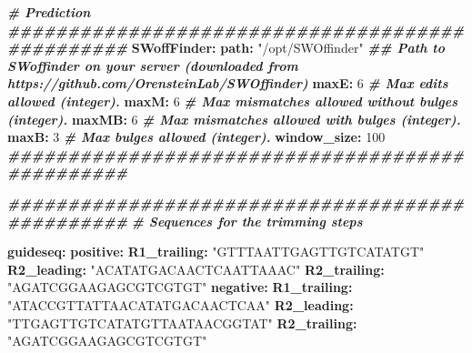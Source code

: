 \documentclass[
]{article}
\newenvironment{Shaded}{\begin{snugshade}}{\end{snugshade}}
\newcommand{\AttributeTok}[1]{\textcolor[rgb]{0.74,0.68,0.62}{#1}}
\newcommand{\CommentTok}[1]{\textcolor[rgb]{0.00,0.40,1.00}{\textbf{\textit{#1}}}}
\newcommand{\DecValTok}[1]{\textcolor[rgb]{0.27,0.67,0.26}{#1}}
\newcommand{\FunctionTok}[1]{\textcolor[rgb]{1.00,0.58,0.35}{\textbf{#1}}}
\newcommand{\KeywordTok}[1]{\textcolor[rgb]{0.26,0.66,0.93}{\textbf{#1}}}
\newcommand{\StringTok}[1]{\textcolor[rgb]{0.02,0.61,0.04}{#1}}
\begin{document}
\begin{Shaded}
\begin{Highlighting}[]
\CommentTok{\# Prediction}
\CommentTok{\#\#\#\#\#\#\#\#\#\#\#\#\#\#\#\#\#\#\#\#\#\#\#\#\#\#\#\#\#\#\#\#\#\#\#\#\#\#\#\#\#\#\#\#\#\#\#\#}
\FunctionTok{SWoffFinder}\KeywordTok{:}
\AttributeTok{  }\FunctionTok{path}\KeywordTok{:}\AttributeTok{ }\StringTok{"/opt/SWOffinder"}\CommentTok{ \#\# Path to SWoffinder on your server (downloaded from https://github.com/OrensteinLab/SWOffinder)}
\AttributeTok{  }\FunctionTok{maxE}\KeywordTok{:}\AttributeTok{ }\DecValTok{6}\CommentTok{                 \# Max edits allowed (integer).}
\AttributeTok{  }\FunctionTok{maxM}\KeywordTok{:}\AttributeTok{ }\DecValTok{6}\CommentTok{                 \# Max mismatches allowed without bulges (integer).}
\AttributeTok{  }\FunctionTok{maxMB}\KeywordTok{:}\AttributeTok{ }\DecValTok{6}\CommentTok{                \# Max mismatches allowed with bulges (integer).}
\AttributeTok{  }\FunctionTok{maxB}\KeywordTok{:}\AttributeTok{ }\DecValTok{3}\CommentTok{                 \# Max bulges allowed (integer).}
\AttributeTok{  }\FunctionTok{window\_size}\KeywordTok{:}\AttributeTok{ }\DecValTok{100}
\CommentTok{\#\#\#\#\#\#\#\#\#\#\#\#\#\#\#\#\#\#\#\#\#\#\#\#\#\#\#\#\#\#\#\#\#\#\#\#\#\#\#\#\#\#\#\#\#\#\#\#}



\CommentTok{\#\#\#\#\#\#\#\#\#\#\#\#\#\#\#\#\#\#\#\#\#\#\#\#\#\#\#\#\#\#\#\#\#\#\#\#\#\#\#\#\#\#\#\#\#\#\#\#}
\CommentTok{\# Sequences for the trimming steps}

\FunctionTok{guideseq}\KeywordTok{:}
\AttributeTok{  }\FunctionTok{positive}\KeywordTok{:}
\AttributeTok{    }\FunctionTok{R1\_trailing}\KeywordTok{:}\AttributeTok{ }\StringTok{"GTTTAATTGAGTTGTCATATGT"}
\AttributeTok{    }\FunctionTok{R2\_leading}\KeywordTok{:}\AttributeTok{ }\StringTok{"ACATATGACAACTCAATTAAAC"}
\AttributeTok{    }\FunctionTok{R2\_trailing}\KeywordTok{:}\AttributeTok{ }\StringTok{"AGATCGGAAGAGCGTCGTGT"}
\AttributeTok{  }\FunctionTok{negative}\KeywordTok{:}
\AttributeTok{    }\FunctionTok{R1\_trailing}\KeywordTok{:}\AttributeTok{ }\StringTok{"ATACCGTTATTAACATATGACAACTCAA"}
\AttributeTok{    }\FunctionTok{R2\_leading}\KeywordTok{:}\AttributeTok{ }\StringTok{"TTGAGTTGTCATATGTTAATAACGGTAT"}
\AttributeTok{    }\FunctionTok{R2\_trailing}\KeywordTok{:}\AttributeTok{ }\StringTok{"AGATCGGAAGAGCGTCGTGT"}




\end{Highlighting}
\end{Shaded}
\end{document}
